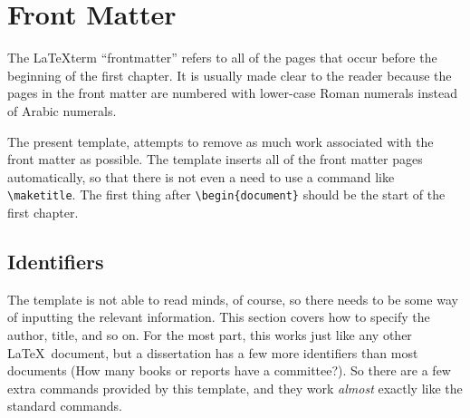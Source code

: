 \documentclass[thesis]{../cls/thesis-umich}
\begin{document}
\section{Front Matter}
The \LaTeX term ``frontmatter'' refers to all of the pages that occur
before the beginning of the first chapter.  It is usually made clear
to the reader because the pages in the front matter are numbered with
lower-case Roman numerals instead of Arabic numerals.

The present template,  attempts to remove as
much work associated with the front matter as possible.  The template
inserts all of the front matter pages automatically, so that there is
not even a need to use a command like \verb|\maketitle|.  The first
thing after \verb|\begin{document}| should be the start of the first
chapter.

\subsection{Identifiers}
The template is not able to read minds, of course, so there needs to be
some way of inputting the relevant information.  This section covers how
to specify the author, title, and so on.  For the most part, this works
just like any other \LaTeX~document, but a dissertation has a few more
identifiers than most documents (How many books or reports have a
committee?).  So there are a few extra commands provided by this
template, and they work \emph{almost} exactly like the standard
commands.
\end{document}
